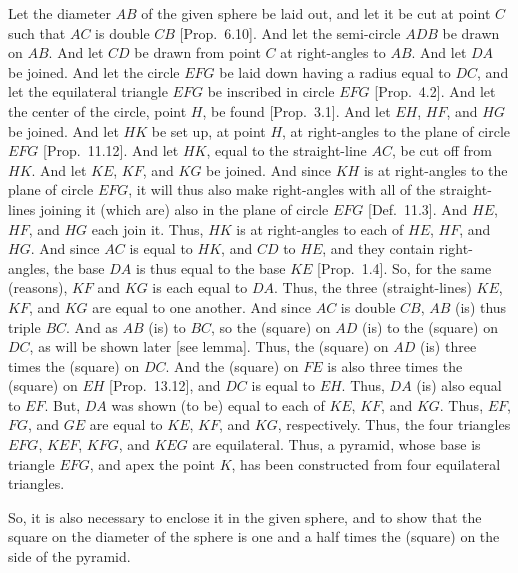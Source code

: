 \begin{Parallel}{}{}
{Let the diameter $AB$ of the given sphere be laid out, and let it be
cut at point $C$ such that $AC$ is double $CB$ [Prop.~6.10]. And let the semi-circle 
$ADB$  be drawn on $AB$. And let $CD$ be drawn from point
$C$ at right-angles to $AB$. And let $DA$ be joined. 
And let the circle $EFG$ be laid down having a radius equal to $DC$,
and let the equilateral triangle $EFG$ be inscribed in circle
$EFG$ [Prop.~4.2]. And let the center of the circle, point $H$,
be found [Prop.~3.1]. And let $EH$, $HF$, and $HG$ be
joined. And let $HK$ be set up, at point $H$, at right-angles to the
plane of circle $EFG$ [Prop.~11.12]. And let $HK$, equal to the straight-line $AC$, be cut off from $HK$. And let $KE$, $KF$, and $KG$ be joined.
And since $KH$ is at right-angles to the plane of circle $EFG$, it will
thus also make right-angles with all of the straight-lines joining it
(which are) also in the plane of circle $EFG$ [Def.~11.3]. And $HE$, $HF$,
and $HG$ each join it. Thus, $HK$ is at right-angles to each of $HE$,
$HF$, and $HG$. And since  $AC$ is equal to $HK$, and $CD$ to
$HE$, and they contain right-angles, the base $DA$ is thus equal to the base 
$KE$ [Prop.~1.4]. So, for the same (reasons),  $KF$ and
$KG$ is each equal to $DA$. Thus, the three (straight-lines)
$KE$, $KF$, and $KG$ are equal to one another. And since 
$AC$ is double $CB$, $AB$ (is) thus triple $BC$. And as 
$AB$ (is) to $BC$, so the (square) on $AD$ (is) to the (square)
on $DC$, as will be shown later [see lemma]. Thus, the (square)
on $AD$ (is) three times the (square) on $DC$. And the (square)
on $FE$ is also three times the (square) on $EH$ [Prop.~13.12], 
and $DC$ is equal to $EH$. Thus, $DA$ (is) also equal to $EF$.
But, $DA$ was shown (to be) equal to each of $KE$, $KF$, and
$KG$. Thus, $EF$, $FG$, and $GE$ are equal to 
$KE$, $KF$, and $KG$, respectively. Thus, the four triangles $EFG$, $KEF$,
$KFG$, and $KEG$ are equilateral. Thus, a pyramid, whose base is triangle
$EFG$, and apex the point $K$,   has been
constructed from four equilateral triangles.

\epsfysize=3.5in
\centerline{}

So, it is also necessary to enclose it in the given sphere, and to show that
the square on the diameter of the sphere is one and a half times the (square)
on the side of the pyramid. 

}
\end{Parallel}
